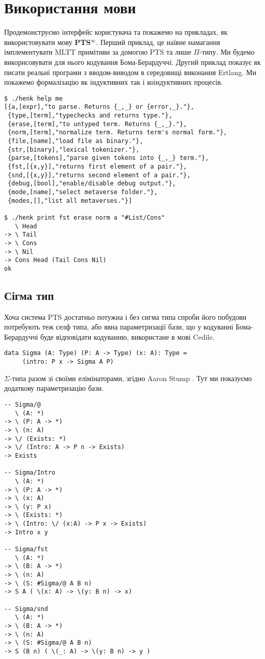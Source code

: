 \documentclass{article}
\begin{document}
\section{Використання мови}

Продемонструємо інтерфейс користувача та покажемо на прикладах, як використовувати мову \textbf{PTS$^\infty$}.
Перший приклад, це наївне намагання імплементувати MLTT примітиви за домогою PTS та лише $\Pi$-типу. Ми будемо
викорисовувати для нього кодування Бома-Берардуччі\cite{Bohm85}. Другий приклад показує як писати реальні програми
з вводом-виводом в середовищі виконання Ertlang. Ми покажемо формалізацію як індуктивних так і коіндуктивних процесів.

\begin{lstlisting}
$ ./henk help me
[{a,[expr],"to parse. Returns {_,_} or {error,_}."},
 {type,[term],"typechecks and returns type."},
 {erase,[term],"to untyped term. Returns {_,_}."},
 {norm,[term],"normalize term. Returns term's normal form."},
 {file,[name],"load file as binary."},
 {str,[binary],"lexical tokenizer."},
 {parse,[tokens],"parse given tokens into {_,_} term."},
 {fst,[{x,y}],"returns first element of a pair."},
 {snd,[{x,y}],"returns second element of a pair."},
 {debug,[bool],"enable/disable debug output."},
 {mode,[name],"select metaverse folder."},
 {modes,[],"list all metaverses."}]

$ ./henk print fst erase norm a "#List/Cons"
   \ Head
-> \ Tail
-> \ Cons
-> \ Nil
-> Cons Head (Tail Cons Nil)
ok
\end{lstlisting}

\subsection{Сігма тип}
Хоча система PTS достатньо потужна і без сигма типа спроби його побудови потребують теж селф типа, або явна параметризації бази,
що у кодуванні Бома-Берардуччі буде відповідати кодуванню, використане в мові Cedile.

\begin{lstlisting}
data Sigma (A: Type) (P: A -> Type) (x: A): Type =
     (intro: P x -> Sigma A P)
\end{lstlisting}

{\bf $\Sigma$}-типа разом зі своїми елімінаторами, згідно Aaron Stump \cite{Stump17}.
Тут ми показуємо додаткову параметризацію бази.

\begin{lstlisting}
-- Sigma/@
   \ (A: *)
-> \ (P: A -> *)
-> \ (n: A)
-> \/ (Exists: *)
-> \/ (Intro: A -> P n -> Exists)
-> Exists

-- Sigma/Intro
   \ (A: *)
-> \ (P: A -> *)
-> \ (x: A)
-> \ (y: P x)
-> \ (Exists: *)
-> \ (Intro: \/ (x:A) -> P x -> Exists)
-> Intro x y

-- Sigma/fst
   \ (A: *)
-> \ (B: A -> *)
-> \ (n: A)
-> \ (S: #Sigma/@ A B n)
-> S A ( \(x: A) -> \(y: B n) -> x)

-- Sigma/snd
   \ (A: *)
-> \ (B: A -> *)
-> \ (n: A)
-> \ (S: #Sigma/@ A B n)
-> S (B n) ( \(_: A) -> \(y: B n) -> y )
\end{lstlisting}
\end{document}
